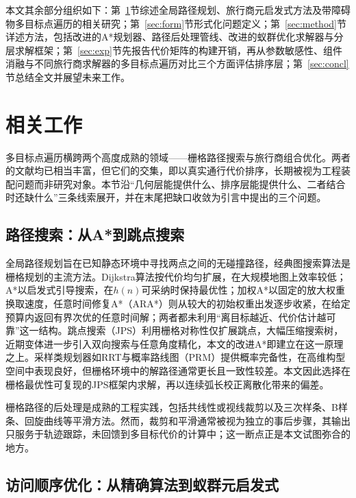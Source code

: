 \documentclass[lettersize,journal]{IEEEtran}
\begin{document}
本文其余部分组织如下：第~\ref{sec:related}节综述全局路径规划、旅行商元启发式方法及带障碍物多目标点遍历的相关研究；第~\ref{sec:form}节形式化问题定义；第~\ref{sec:method}节详述方法，包括改进的A*规划器、路径后处理管线、改进的蚁群优化求解器与分层求解框架；第~\ref{sec:exp}节先报告代价矩阵的构建开销，再从参数敏感性、组件消融与不同旅行商求解器的多目标点遍历对比三个方面评估排序层；第~\ref{sec:concl}节总结全文并展望未来工作。

\section{相关工作}

\label{sec:related}

多目标点遍历横跨两个高度成熟的领域——栅格路径搜索与旅行商组合优化。两者的文献均已相当丰富，但它们的交集，即以真实通行代价排序，长期被视为工程装配问题而非研究对象。本节沿“几何层能提供什么、排序层能提供什么、二者结合时还缺什么”三条线索展开，并在末尾把缺口收敛为引言中提出的三个问题。

\subsection{路径搜索：从A*到跳点搜索}

全局路径规划旨在已知静态环境中寻找两点之间的无碰撞路径，经典图搜索算法是栅格规划的主流方法\cite{ref33,ref34,ref35}。Dijkstra算法按代价均匀扩展，在大规模地图上效率较低\cite{ref6}；A*以启发式引导搜索，在$h(n)$可采纳时保持最优性\cite{ref5}；加权A*以固定的放大权重换取速度，任意时间修复A*（ARA*）则从较大的初始权重出发逐步收紧，在给定预算内返回有界次优的任意时间解\cite{ref8,ref10}；两者都未利用“离目标越近、代价估计越可靠”这一结构。跳点搜索（JPS）利用栅格对称性仅扩展跳点，大幅压缩搜索树\cite{ref11,ref12,ref44}，近期变体进一步引入双向搜索与任意角度精化\cite{ref13,ref14,ref15}，本文的改进A*即建立在这一原理之上。采样类规划器如RRT\cite{ref7}与概率路线图（PRM）提供概率完备性，在高维构型空间中表现良好，但栅格环境中的解路径通常更长且一致性较差。本文因此选择在栅格最优性可复现的JPS框架内求解，再以连续弧长校正离散化带来的偏差。

栅格路径的后处理是成熟的工程实践，包括共线性或视线裁剪\cite{ref16}以及三次样条、B样条、回旋曲线等平滑方法\cite{ref17,ref41}。然而，裁剪和平滑通常被视为独立的事后步骤，其输出只服务于轨迹跟踪，未回馈到多目标代价的计算中；这一断点正是本文试图弥合的地方。

\subsection{访问顺序优化：从精确算法到蚁群元启发式}
\end{document}
